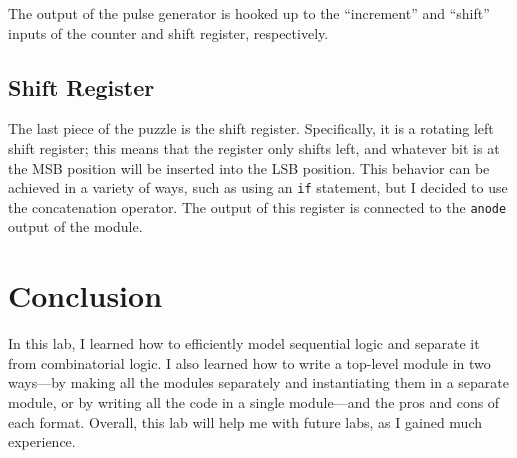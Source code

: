 \documentclass{article}
\begin{document}
The output of the pulse generator is hooked up to the
``increment'' and
``shift'' inputs of the counter and shift register, respectively.

\subsection{Shift Register} The last piece of the puzzle is
the shift register. Specifically, it is a rotating left shift
register; this means that the register only shifts left, and
whatever bit is at the MSB position will be inserted into the
LSB position. This behavior can be achieved in a variety of
ways, such as using an \texttt{if} statement, but I decided
to use the concatenation operator. The output of this register
is connected to the \texttt{anode} output of the module.

\section{Conclusion} In this lab, I learned how to efficiently
model sequential logic and separate it from combinatorial logic. I
also learned how to
write a top-level module in two ways---by making all the modules
separately and instantiating them in a separate module, or by 
writing all the code in a single module---and the pros and
cons of each format. Overall, this lab will help me with future
labs, as I gained much experience.
\end{document}
